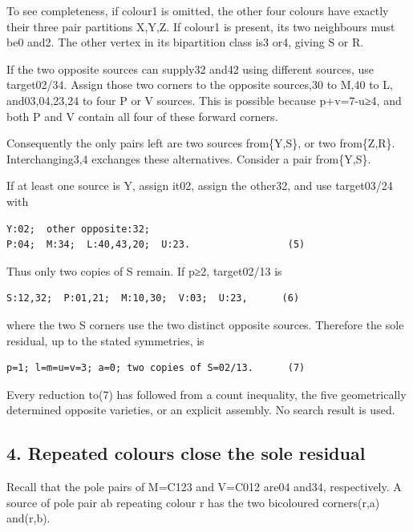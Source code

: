 \documentclass[
  10pt,
]{article}
\begin{document}
To see completeness, if colour1 is omitted, the other four colours have
exactly their three pair partitions X,Y,Z. If colour1 is present, its
two neighbours must be0 and2. The other vertex in its bipartition class
is3 or4, giving S or R.

If the two opposite sources can supply32 and42 using different sources,
use target02/34. Assign those two corners to the opposite sources,30 to
M,40 to L, and03,04,23,24 to four P or V sources. This is possible
because p+v=7-u≥4, and both P and V contain all four of these forward
corners.

Consequently the only pairs left are two sources from\{Y,S\}, or two
from\{Z,R\}. Interchanging3,4 exchanges these alternatives. Consider a
pair from\{Y,S\}.

If at least one source is Y, assign it02, assign the other32, and use
target03/24 with

\begin{verbatim}
Y:02;  other opposite:32;
P:04;  M:34;  L:40,43,20;  U:23.                 (5)
\end{verbatim}

Thus only two copies of S remain. If p≥2, target02/13 is

\begin{verbatim}
S:12,32;  P:01,21;  M:10,30;  V:03;  U:23,      (6)
\end{verbatim}

where the two S corners use the two distinct opposite sources. Therefore
the sole residual, up to the stated symmetries, is

\begin{verbatim}
p=1; l=m=u=v=3; a=0; two copies of S=02/13.      (7)
\end{verbatim}

Every reduction to(7) has followed from a count inequality, the five
geometrically determined opposite varieties, or an explicit assembly. No
search result is used.

\hypertarget{repeated-colours-close-the-sole-residual}{%
\subsection*{4. Repeated colours close the sole
residual}\label{repeated-colours-close-the-sole-residual}}

Recall that the pole pairs of M=C123 and V=C012 are04 and34,
respectively. A source of pole pair ab repeating colour r has the two
bicoloured corners(r,a) and(r,b).
\end{document}
